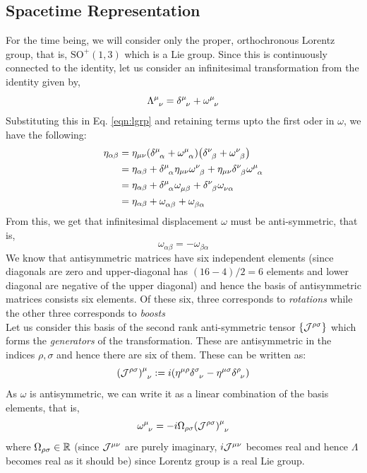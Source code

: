 \subsection{Spacetime Representation}
For the time being, we will consider only the proper, orthochronous Lorentz group, that is, $\mathrm{SO}^+(1,3)$ which is a Lie group. Since this is continuously connected to the identity, let us consider an infinitesimal transformation from the identity given by,
$$\trmat{\mu}{\nu} = \delt{\mu}{\nu}+\tensor{\omega}{^\mu _\nu}$$
Substituting this in Eq. \ref{eqn:lgrp} and retaining terms upto the first oder in $\omega$, we have the following:
\begin{align*}
    \eta_{\alpha \beta} &= \eta_{\mu\nu} \qty(\delt{\mu}{\alpha} + \tensor{\omega}{^\mu _\alpha})\qty(\delt{\nu}{\beta} + \tensor{\omega}{^\nu _\beta})\\
    &=\eta_{\alpha\beta} + \delt{\mu}{\alpha}\eta_{\mu\nu}\tensor{\omega}{^\nu _\beta} + \eta_{\mu\nu}\delt{\nu}{\beta} \tensor{\omega}{^\mu _\alpha}\\
    &=\eta_{\alpha\beta} + \delt{\mu}{\alpha}\tensor{\omega}{_\mu _\beta} + \delt{\nu}{\beta} \tensor{\omega}{_\nu _\alpha}\\
    &=\eta_{\alpha\beta} + \tensor{\omega}{_\alpha _\beta} +  \tensor{\omega}{_\beta _\alpha}
\end{align*}
From this, we get that infinitesimal displacement $\omega$ must be anti-symmetric, that is, 
$$\boxed{\omega_{\alpha\beta} = -\omega_{\beta\alpha}}$$
We know that antisymmetric matrices have six independent elements (since diagonals are zero and upper-diagonal has $(16-4)/2 = 6$ elements and lower diagonal are negative of the upper diagonal) and hence the basis of antisymmetric matrices consists six elements. Of these six, three corresponds to \textit{rotations} while the other three corresponds to \textit{boosts}\\[0.2cm] Let us consider this basis of the second rank anti-symmetric tensor $\{\mathcal J^{\rho\sigma}\}$ which forms the \textit{generators} of the transformation. These are antisymmetric in the indices $\rho, \sigma$ and hence there are six of them. These can be written as:
$$\tensor{{\qty(\SJ^{\rho\sigma})}}{^\mu _\nu} :=i \qty(\eta^{\mu\rho} \tensor{\delta}{^\sigma _\nu} - \eta^{\mu\sigma} \tensor{\delta}{^\rho _\nu})$$
As $\omega$ is antisymmetric, we can write it as a linear combination of the basis elements, that is, 
$$\tensor{\omega}{^\mu _\nu} =-i \Omega_{\rho\sigma}\tensor{{\qty(\SJ^{\rho\sigma})}}{^\mu _\nu}$$
where $\Omega_{\rho\sigma}\in \mathbb{R}$ (since $\mathcal J^{\mu\nu}$ are purely imaginary, $ i\mathcal J^{\mu\nu}$ becomes real and hence $\Lambda$ becomes real as it should be) since Lorentz group is a real Lie group. 
